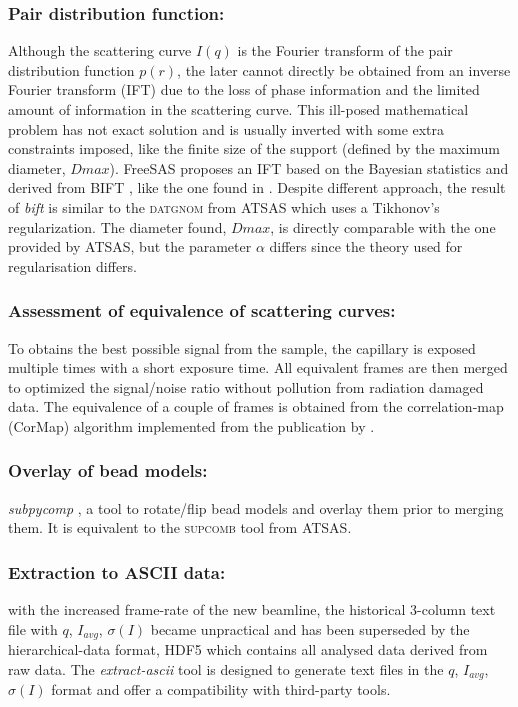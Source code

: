 \documentclass[preprint]{iucr}              %
\begin{document}
\subsubsection{Pair distribution function:}
Although the scattering curve $I(q)$ is the Fourier transform of the pair distribution function $p(r)$, the later cannot directly be obtained from an inverse Fourier transform (IFT) due to the loss of phase information and the limited amount of information in the scattering curve. 
This ill-posed mathematical problem has not exact solution and is usually inverted with some extra constraints imposed, like the finite size of the support (defined by the maximum diameter, $Dmax$).    
FreeSAS proposes an IFT based on the Bayesian statistics and derived from BIFT \cite{bift}, like the one found in .
Despite different approach, the result of \textit{bift} is similar to the \textsc{datgnom} \cite{ATSAS1} from ATSAS which uses a Tikhonov's regularization.
The diameter found, $Dmax$, is directly comparable with the one provided by ATSAS, but the parameter $\alpha$ differs since the theory used for regularisation differs. 

\subsubsection{Assessment of equivalence of scattering curves: }
To obtains the best possible signal from the sample, the capillary is exposed multiple times with a short exposure time.
All equivalent frames are then merged to optimized the signal/noise ratio without pollution from radiation damaged data.  
The equivalence of a couple of frames is obtained from the correlation-map (CorMap) algorithm implemented from the publication by .

\subsubsection{Overlay of bead models:}
\textit{subpycomp} \cite{BM29ODA}, a tool to rotate/flip bead models and overlay them prior to merging them. It is equivalent to the \textsc{supcomb} \cite{supcomb} tool from ATSAS. 

\subsubsection{Extraction to ASCII data:} with the increased frame-rate of the new beamline, the historical 3-column text file with $q$, $I_{avg}$, $\sigma(I)$ became unpractical and has been superseded by the hierarchical-data format, HDF5 \cite{hdf5} which contains all analysed data derived from raw data.
The \textit{extract-ascii} tool is designed to generate text files in the  $q$, $I_{avg}$, $\sigma(I)$ format and offer a compatibility with third-party tools.
\end{document}
